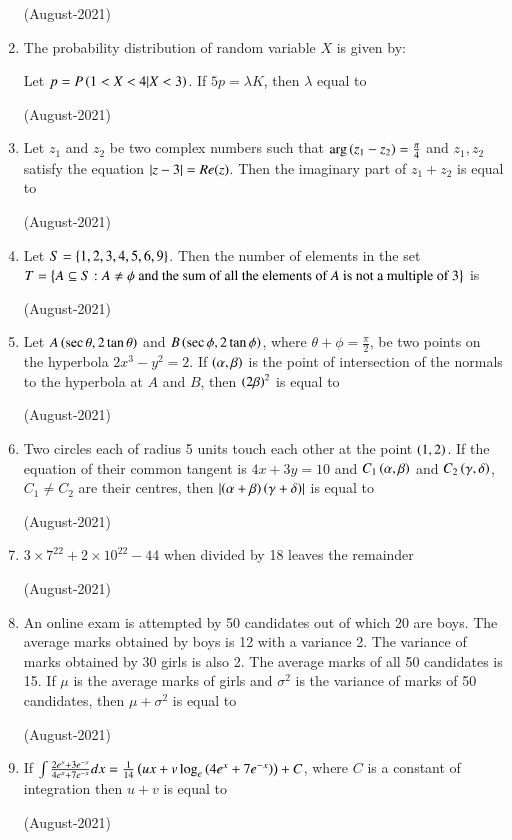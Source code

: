 \documentclass[journal]{IEEEtran}
\begin{document}
\begin{enumerate}
    \hfill (August-2021) 
    
    \item The probability distribution of random variable $X$ is given by: \\
    \begin{table}[h!]
    \centering
    
    \end{table} 
    
    Let $p = P \left(1 < X < 4 | X < 3\right)$. If $5p = \lambda K$, then $\lambda$ equal to 
    
    \hfill(August-2021) 
    
    \item Let $z_1$ and $z_2$ be two complex numbers such that $\arg{\ensuremath{\left(z_1 - z_2\right)}} = \frac{\pi}{4}$ 
 and $z_1, z_2$ satisfy the equation $\left\vert z -
 3 \right\vert= Re(z)$. Then the imaginary part of $z_1 + z_2$ is equal to 
 
 \hfill(August-2021)
 
 \item Let $S=\left\{1, 2, 3, 4, 5, 6, 9\right\}$. Then the number of elements in the set $T = \left\{ A\subseteq 
 S : A \neq \phi  \text{ and the sum of all the elements of $A$ is not a multiple of 3}\right\}$ is 
     
     \hfill(August-2021)
     
    \item Let $A\left(\sec \theta, 2\tan \theta\right)$ and $B \left(\sec \phi, 2 \tan \phi\right)$, where $\theta + \phi = \frac{\pi}{2}$, be two points on the hyperbola $2x^3 - y^2 = 2$. If $\left(\alpha, \beta\right)$ is the point of intersection of the normals to the hyperbola at $A$ and $B$, then $\left(2\beta\right)^2$ is equal to 
    
    \hfill (August-2021)
    
    \item Two circles each of radius 5 units touch each other at the point $\left(1,2\right)$. If the equation of their common tangent is $4x + 3y = 10$ and $C_1 \left(\alpha,\beta\right)$ and $C_2 \left(\gamma, \delta\right)$, $C_1 \neq C_2$ are their centres, then $\left\vert\left(\alpha+\beta\right)\left(\gamma+\delta\right)\right\vert$
    is equal to 
    
    \hfill (August-2021)
    
    \item $3 \times 7^{22} + 2 \times 10^{22} - 44$ when divided by 18 leaves the remainder  
    
    \hfill (August-2021)
    
    \item An online exam is attempted by 50 candidates out of which 20 are boys. The average marks obtained by boys is 12 with a variance 2. The variance of marks obtained by 30 girls is also 2. The average marks of all 50 candidates is 15. If $\mu$ is the average marks of girls and $\sigma ^2$
 is the variance of marks of 50 candidates, then 
$\mu + \sigma^2$ is equal to

\hfill(August-2021)
\item If $\int \frac{2e^x + 3e^{-x}}{4e^x+ 7e^{-x}}dx = \frac{1}{14} \left(ux + v \log_e \left(4e^x + 7e^{-x}\right)\right) + C$, where $C$ is a constant of integration then $u + v$ is equal to 

\hfill (August-2021)
\end{enumerate}
\end{document}
